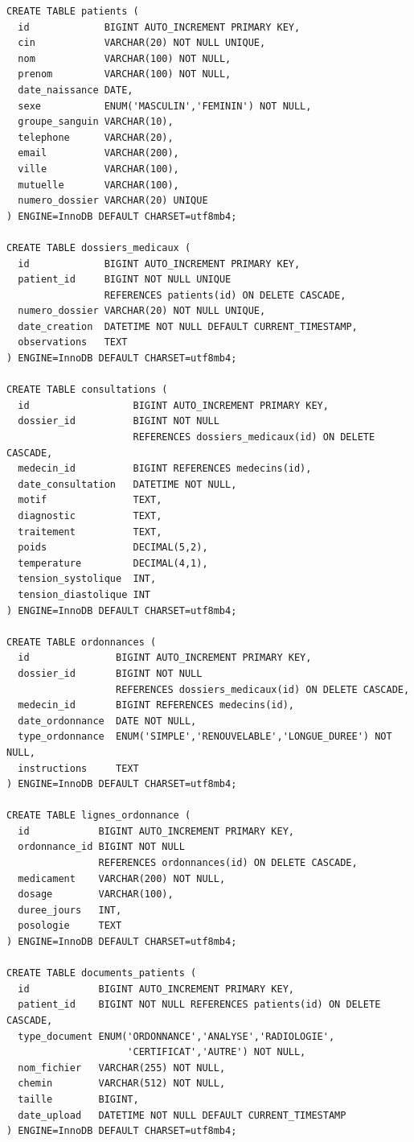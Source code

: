 \begin{lstlisting}[style=sql, caption={Tables principales ms-patient-personnel}]
CREATE TABLE patients (
  id             BIGINT AUTO_INCREMENT PRIMARY KEY,
  cin            VARCHAR(20) NOT NULL UNIQUE,
  nom            VARCHAR(100) NOT NULL,
  prenom         VARCHAR(100) NOT NULL,
  date_naissance DATE,
  sexe           ENUM('MASCULIN','FEMININ') NOT NULL,
  groupe_sanguin VARCHAR(10),
  telephone      VARCHAR(20),
  email          VARCHAR(200),
  ville          VARCHAR(100),
  mutuelle       VARCHAR(100),
  numero_dossier VARCHAR(20) UNIQUE
) ENGINE=InnoDB DEFAULT CHARSET=utf8mb4;

CREATE TABLE dossiers_medicaux (
  id             BIGINT AUTO_INCREMENT PRIMARY KEY,
  patient_id     BIGINT NOT NULL UNIQUE
                 REFERENCES patients(id) ON DELETE CASCADE,
  numero_dossier VARCHAR(20) NOT NULL UNIQUE,
  date_creation  DATETIME NOT NULL DEFAULT CURRENT_TIMESTAMP,
  observations   TEXT
) ENGINE=InnoDB DEFAULT CHARSET=utf8mb4;

CREATE TABLE consultations (
  id                  BIGINT AUTO_INCREMENT PRIMARY KEY,
  dossier_id          BIGINT NOT NULL
                      REFERENCES dossiers_medicaux(id) ON DELETE CASCADE,
  medecin_id          BIGINT REFERENCES medecins(id),
  date_consultation   DATETIME NOT NULL,
  motif               TEXT,
  diagnostic          TEXT,
  traitement          TEXT,
  poids               DECIMAL(5,2),
  temperature         DECIMAL(4,1),
  tension_systolique  INT,
  tension_diastolique INT
) ENGINE=InnoDB DEFAULT CHARSET=utf8mb4;

CREATE TABLE ordonnances (
  id               BIGINT AUTO_INCREMENT PRIMARY KEY,
  dossier_id       BIGINT NOT NULL
                   REFERENCES dossiers_medicaux(id) ON DELETE CASCADE,
  medecin_id       BIGINT REFERENCES medecins(id),
  date_ordonnance  DATE NOT NULL,
  type_ordonnance  ENUM('SIMPLE','RENOUVELABLE','LONGUE_DUREE') NOT NULL,
  instructions     TEXT
) ENGINE=InnoDB DEFAULT CHARSET=utf8mb4;

CREATE TABLE lignes_ordonnance (
  id            BIGINT AUTO_INCREMENT PRIMARY KEY,
  ordonnance_id BIGINT NOT NULL
                REFERENCES ordonnances(id) ON DELETE CASCADE,
  medicament    VARCHAR(200) NOT NULL,
  dosage        VARCHAR(100),
  duree_jours   INT,
  posologie     TEXT
) ENGINE=InnoDB DEFAULT CHARSET=utf8mb4;

CREATE TABLE documents_patients (
  id            BIGINT AUTO_INCREMENT PRIMARY KEY,
  patient_id    BIGINT NOT NULL REFERENCES patients(id) ON DELETE CASCADE,
  type_document ENUM('ORDONNANCE','ANALYSE','RADIOLOGIE',
                     'CERTIFICAT','AUTRE') NOT NULL,
  nom_fichier   VARCHAR(255) NOT NULL,
  chemin        VARCHAR(512) NOT NULL,
  taille        BIGINT,
  date_upload   DATETIME NOT NULL DEFAULT CURRENT_TIMESTAMP
) ENGINE=InnoDB DEFAULT CHARSET=utf8mb4;
\end{lstlisting}
